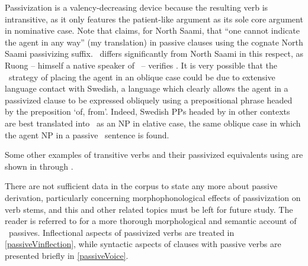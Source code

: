 Passivization is a valency-decreasing device because the resulting verb is intransitive, as it only features the patient-like argument as its sole core argument in nominative case. Note that \citet[92]{Svonni2009} claims, for North Saami, that “one cannot indicate the agent in any way” (my translation) in passive clauses using the cognate North Saami passivizing suffix. \PS\ differs significantly from North Saami in this respect, as Ruong – himself a native speaker of \PS\ – verifies \citep[cf.][41]{Ruong1943}. It is very possible that the \PS\ strategy of placing the agent in an oblique case could be due to extensive language contact with Swedish, a language which clearly allows the agent in a passivized clause to be expressed obliquely using a prepositional phrase headed by the preposition  ‘of, from’. 
Indeed, Swedish PPs headed by  in other contexts are best translated into \PS\ as an NP in elative case, the same oblique case in which the agent NP in a passive \PS\ sentence is found. 

Some other examples of transitive verbs and their passivized equivalents using  are shown in  through .
\ea\label{vblzDUVVex1}
\z
\ea\label{vblzDUVVex2}
\z
\ea\label{vblzDUVVex3}
\z

There are not sufficient data in the corpus to state any more about passive derivation, particularly concerning morphophonological effects of passivization on verb stems, and this and other related topics must be left for future study. The reader is referred to \citet{Ruong1943} for a more thorough morphological and semantic account of \PS\ passives. 
Inflectional aspects of passivized verbs are treated in \SEC\ref{passiveVinflection}, while syntactic aspects of clauses with passive verbs are presented briefly in \SEC\ref{passiveVoice}. 

